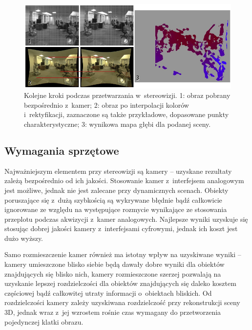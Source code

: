 \begin{figure}[h!]
\centering
\includegraphics{../../Common/img/stereo_steps}
\caption[Kolejne kroki podczas przetwarzania w~stereowizji]
{Kolejne kroki podczas przetwarzania w~stereowizji. 1: obraz pobrany
bezpośrednio z~kamer; 2: obraz po interpolacji kolorów i~rektyfikacji,
zaznaczone są także przykładowe, dopasowane punkty charakterystyczne; 3:
wynikowa mapa głębi dla podanej sceny.}
\label{fig:stereo_steps}
\end{figure}

\subsection{Wymagania sprzętowe}

Najważniejszym elementem przy stereowizji są kamery -- uzyskane rezultaty zależą
bezpośrednio od ich jakości. Stosowanie kamer z~interfejsem analogowym jest
możliwe, jednak nie jest zalecane przy dynamicznych scenach. Obiekty
poruszające się z~dużą szybkością są wykrywane błędnie bądź całkowicie
ignorowane ze względu na występujące rozmycie wynikające ze stosowania
przeplotu podczas akwizycji z~kamer analogowych. Najlepsze wyniki uzyskuje się
stosując dobrej jakości kamery z~interfejsami cyfrowymi, jednak ich koszt jest
dużo wyższy.

Samo rozmieszczenie kamer również ma istotny wpływ na uzyskiwane wyniki --
kamery umieszczone blisko siebie będą dawały dobre wyniki dla obiektów
znajdujących się blisko nich, kamery rozmieszczone szerzej pozwalają na
uzyskanie lepszej rozdzielczości dla obiektów znajdujących się daleko kosztem
częściowej bądź całkowitej utraty informacji o~obiektach bliskich. Od
rozdzielczości kamery zależy uzyskiwana rozdzielczość przy rekonstrukcji sceny
3D, jednak wraz z~jej wzrostem rośnie czas wymagany do przetworzenia
pojedynczej klatki obrazu.

